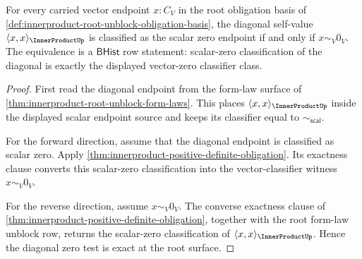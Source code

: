 \begin{theorem}
\label{thm:innerproduct-root-diagonal-zero-exactness}
For every carried vector endpoint $x:C_V$ in the root obligation basis of
\autoref{def:innerproduct-root-unblock-obligation-basis}, the diagonal
self-value $\langle x,x\rangle_{\InnerProductUp}$ is classified as the scalar
zero endpoint if and only if $x\sim_V0_V$. The equivalence is a
$\mathsf{BHist}$ row statement: scalar-zero classification of the diagonal is
exactly the displayed vector-zero classifier class.
\end{theorem}
\begin{proof}
First read the diagonal endpoint from the form-law surface of
\autoref{thm:innerproduct-root-unblock-form-laws}. This places
$\langle x,x\rangle_{\InnerProductUp}$ inside the displayed scalar endpoint
source and keeps its classifier equal to $\sim_{\mathsf{scal}}$.

For the forward direction, assume that the diagonal endpoint is classified as
scalar zero. Apply
\autoref{thm:innerproduct-positive-definite-obligation}. Its exactness clause
converts this scalar-zero classification into the vector-classifier witness
$x\sim_V0_V$.

For the reverse direction, assume $x\sim_V0_V$. The converse exactness clause
of \autoref{thm:innerproduct-positive-definite-obligation}, together with the
root form-law unblock row, returns the scalar-zero classification of
$\langle x,x\rangle_{\InnerProductUp}$. Hence the diagonal zero test is exact
at the root surface.
\end{proof}

